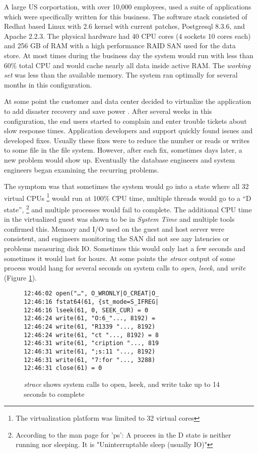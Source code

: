 A large US corportation, with over 10,000 employees, used a suite of applications which were specifically written for this business. The software stack consisted of Redhat based Linux with 2.6 kernel with current patches, Postgresql 8.3.6, and Apache 2.2.3.  The physical hardware had 40 CPU cores (4 sockets 10 cores each) and 256 GB of RAM with a high performance RAID SAN used for the data store.  At most times during the business day the system would run with less than 60\% total CPU and would cache nearly all data inside active RAM.  The \emph{working set} was less than the available memory.  The system ran optimally for several months in this configuration.

\indent At some point the customer and data center decided to virtualize the application to add disaster recovery \cite{wood} and save power \cite{lim}.  After several weeks in this configuration, the end users started to complain and enter trouble tickets about slow response times.  Application developers and support quickly found issues and developed fixes.   Usually these fixes were to reduce the number or reads or writes to some file in the file system.  However, after each fix, sometimes days later, a new problem would show up.  Eventually the database engineers and system engineers began examining the recurring problems.

\indent The symptom was that sometimes the system would go into a state where all 32 virtual CPUs \footnote{The virtualization platform was limited to 32 virtual cores} would run at 100\% CPU time, multiple threads would go to a “D state”, \footnote{According to the man page for 'ps':  A procees in the D state is neither running nor sleeping.  It is "Uninterruptable sleep (usually IO)"} and multiple processes would fail to complete.  The additional CPU time in the virtualized guest was shown to be in \emph{System Time} and multiple tools confirmed this.  Memory and I/O used on the guest and host server were consistent, and engineers monitoring the SAN did not see any latencies or problems measuring disk IO.  Sometimes this would only last a few seconds and sometimes it would last for hours. At some points the \emph{strace} output of some process would hang for several seconds on system calls to \emph{open}, \emph{lseek}, and \emph{write} (Figure \ref{fig:syscall}).

\begin{figure}[h]
\begin{Verbatim}
12:46:02 open("…", O_WRONLY|O_CREAT|O_
12:46:16 fstat64(61, {st_mode=S_IFREG| 
12:46:16 lseek(61, 0, SEEK_CUR) = 0 
12:46:24 write(61, "O:6_"..., 8192) =  
12:46:24 write(61, "R1339 "..., 8192)  
12:46:24 write(61, "ct "..., 8192) = 8 
12:46:31 write(61, "cription "..., 819  
12:46:31 write(61, ";s:11 "..., 8192)  
12:46:31 write(61, "7:for "..., 3288)  
12:46:31 close(61) = 0
\end{Verbatim}
\caption{\emph{strace} shows system calls to open, lseek, and write take up to 14 seconds to complete}
\label{fig:syscall}
\end{figure}

